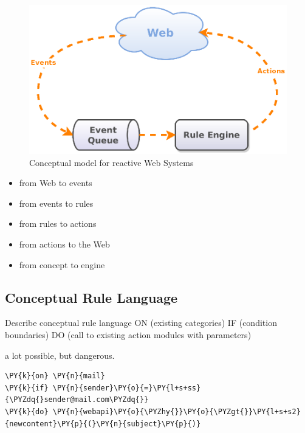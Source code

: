 \begin{figure}[!ht]
  \centering
  \includegraphics{figures/Conceptual_Model}
  \caption{Conceptual model for reactive Web Systems}
  \label{fig:Conceptual_Model}
\end{figure}


\begin{itemize}
  \item from Web to events
  \item from events to rules
  \item from rules to actions
  \item from actions to the Web
  \item from concept to engine
\end{itemize}


\subsection{Conceptual Rule Language}
Describe conceptual rule language
ON (existing categories)
IF (condition boundaries)
DO (call to existing action modules with parameters)

a lot possible, but dangerous.

\begin{Verbatim}[fontsize=\small,commandchars=\\\{\}]
\PY{k}{on} \PY{n}{mail}
\PY{k}{if} \PY{n}{sender}\PY{o}{=}\PY{l+s+ss}{\PYZdq{}sender@mail.com\PYZdq{}}
\PY{k}{do} \PY{n}{webapi}\PY{o}{\PYZhy{}}\PY{o}{\PYZgt{}}\PY{l+s+s2}{newcontent}\PY{p}{(}\PY{n}{subject}\PY{p}{)}
\end{Verbatim}
